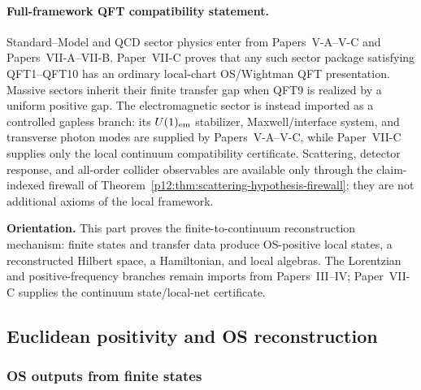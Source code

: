\documentclass[12pt,a4paper]{article}
\begin{document}
\paragraph{Full-framework QFT compatibility statement.}
Standard--Model and QCD sector physics enter from Papers~V-A--V-C and
Papers~VII-A--VII-B.  Paper~VII-C proves that any such sector package satisfying
QFT1--QFT10 has an ordinary local-chart OS/Wightman QFT presentation.  Massive
sectors inherit their finite transfer gap when QFT9 is realized by a uniform
positive gap.  The electromagnetic sector is instead imported as a controlled
gapless branch: its \(U(1)_{\rm em}\) stabilizer, Maxwell/interface system, and
transverse photon modes are supplied by Papers~V-A--V-C, while Paper~VII-C supplies
only the local continuum compatibility certificate.  Scattering, detector
response, and all-order collider observables are available only through the
claim-indexed firewall of
Theorem~\ref{p12:thm:scattering-hypothesis-firewall}; they are not additional
axioms of the local framework.



\noindent\textbf{Orientation.}
This part proves the finite-to-continuum reconstruction mechanism: finite states and transfer data produce OS-positive local states, a reconstructed Hilbert space, a Hamiltonian, and local algebras.  The Lorentzian and positive-frequency branches remain imports from Papers~III--IV; Paper~VII-C supplies the continuum state/local-net certificate.


\subsection{Euclidean positivity and OS reconstruction}
\label{p12:sec:os-reconstruction}


\subsubsection{OS outputs from finite states}
\label{p12:sec:os-reconstruction-ledger}
\end{document}
